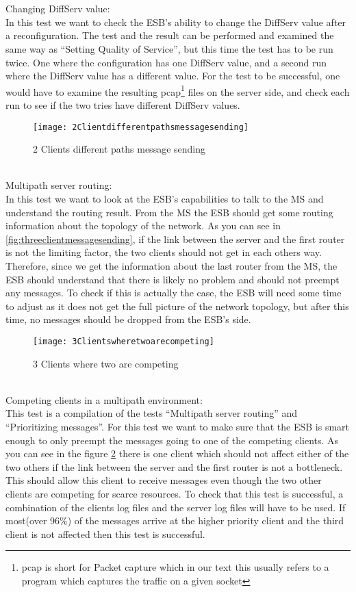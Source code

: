 \\\\
Changing DiffServ value:\\
    In this test we want to check the ESB’s ability to change the DiffServ value after a reconfiguration. The test and the result can be performed and examined the same way as “Setting Quality of Service”, but this time the test has to be run twice. One where the configuration has one DiffServ value, and a second run where the DiffServ value has a different value. For the test to be successful, one would have to examine the resulting \gls{pcap}\footnote{pcap is short for Packet capture which in our text this usually refers to a program which captures the traffic on a given socket} files on the server side, and check each run to see if the two tries have different DiffServ values.
\\
    \begin{figure}[h]
        \centering
        \texttt{[image: 2Clientdifferentpathsmessagesending]}
        \caption{2 Clients different paths message sending}
        \label{fig:2 Clients different paths message sending}
    \end{figure}
\\    
Multipath server routing:\\
    In this test we want to look at the ESB’s capabilities to talk to the MS and understand the routing result. From the MS the ESB should get some routing information about the topology of the network. As you can see in \ref{fig:threeclientmessagesending}, if the link between the server and the first router is not the limiting factor, the two clients should not get in each others way. Therefore, since we get the information about the last router from the MS, the ESB should understand that there is likely no problem and should not preempt any messages. To check if this is actually the case, the ESB will need some time to adjust as it does not get the full picture of the network topology, but after this time, no messages should be dropped from the ESB’s side.
\\
    \begin{figure}[h]
        \centering
        \texttt{[image: 3Clientswheretwoarecompeting]}
        \caption{3 Clients where two are competing}
        \label{fig:3clientstwocompeting}
    \end{figure}
\\
Competing clients in a multipath environment:\\
    This test is a compilation of the tests “Multipath server routing” and “Prioritizing messages”. For this test we want to make sure that the ESB is smart enough to only preempt the messages going to one of the competing clients. As you can see in the figure \ref{fig:3clientstwocompeting} there is one client which should not affect either of the two others if the link between the server and the first router is not a bottleneck. This should allow this client to receive messages even though the two other clients are competing for scarce resources. To check that this test is successful, a combination of the clients log files and the server log files will have to be used. If most(over 96\%) of the messages arrive at the higher priority client and the third client is not affected then this test is successful.
